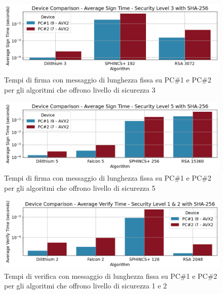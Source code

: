 \begin{figure}[H]
    \centering
    \includegraphics[width=1\textwidth]{Immagini/comparison/Time_Sign/TM_SG_H_192bit_security_level_sha256}
    \caption{Tempi di firma con messaggio di lunghezza fissa su PC\#1 e PC\#2 per gli algoritmi che offrono livello di sicurezza 3}
    \label{fig:TM_SG_H_192bit_security_level_sha256}
\end{figure}

\begin{figure}[H]
    \centering
    \includegraphics[width=1\textwidth]{Immagini/comparison/Time_Sign/TM_SG_H_256bit_security_level_sha256}
    \caption{Tempi di firma con messaggio di lunghezza fissa su PC\#1 e PC\#2 per gli algoritmi che offrono livello di sicurezza 5}
    \label{fig:TM_SG_H_256bit_security_level_sha256}
\end{figure}

\begin{figure}[H]
    \centering
    \includegraphics[width=1\textwidth]{Immagini/comparison/Time_Verify/TM_VF_H_128bit_security_level_sha256.png}
    \caption{Tempi di verifica con messaggio di lunghezza fissa su PC\#1 e PC\#2 per gli algoritmi che offrono livello di sicurezza 1 e 2}
    \label{fig:TM_VF_H_128bit_security_level_sha256}
\end{figure}

